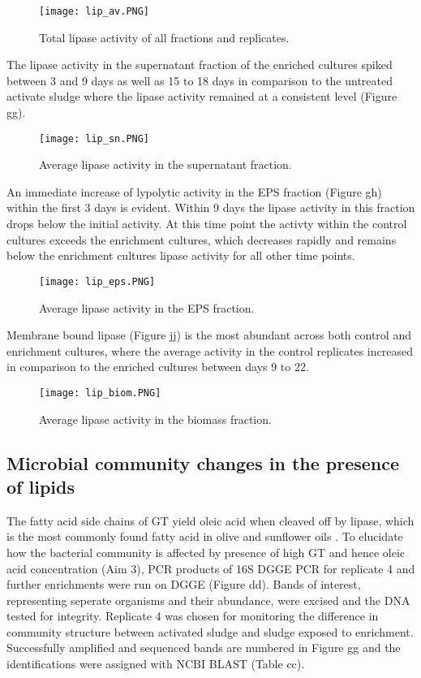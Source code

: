 \documentclass[11pt]{article}
\begin{document}
\begin{figure}
\texttt{[image: lip\_av.PNG]}
\caption{Total lipase activity of all fractions and replicates.}
\end{figure}

The lipase activity in the supernatant fraction of the enriched cultures spiked between 3 and 9 days as well as 15 to 18 days in comparison to the untreated activate sludge where the lipase activity remained at a consistent level (Figure gg).

\begin{figure}
\texttt{[image: lip\_sn.PNG]}
\caption{Average lipase activity in the supernatant fraction.}
\end{figure}

An immediate increase of lypolytic activity in the EPS  fraction (Figure gh) within the first 3 days is evident. Within 9 days the lipase activity in this fraction drops below the initial activity. At this time point the activty within the control cultures exceeds the enrichment cultures, which decreases rapidly and remains below the enrichment cultures lipase activity for all other time points.

\begin{figure}
\texttt{[image: lip\_eps.PNG]}
\caption{Average lipase activity in the EPS fraction.}
\end{figure}

Membrane bound lipase (Figure jj) is the most abundant across both control and enrichment cultures, where the average activity in the control replicates increased in comparison to the enriched cultures between days 9 to 22.

\begin{figure}
\texttt{[image: lip\_biom.PNG]}
\caption{Average lipase activity in the biomass fraction.}
\end{figure}
\FloatBarrier



\subsection{Microbial community changes in the presence of lipids}
The fatty acid side chains of GT yield oleic acid when cleaved off by lipase, which is the most commonly found fatty acid in olive and sunflower oils \cite{haba2000isolation}. To elucidate how the bacterial community is affected by presence of high GT and hence oleic acid concentration (Aim 3), PCR products of 16S DGGE PCR for replicate 4 and further enrichments were run on DGGE (Figure dd). Bands of interest, representing seperate organisms and their abundance, were excised and the DNA tested for integrity. Replicate 4 was chosen for monitoring the difference in community structure between activated sludge and sludge exposed to enrichment. Successfully amplified and sequenced bands are numbered in Figure gg and the identifications were assigned with NCBI BLAST (Table cc). 
\end{document}
